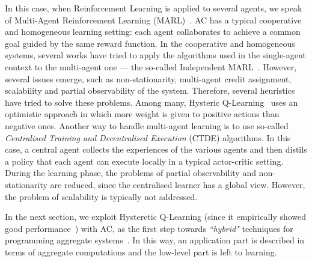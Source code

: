 \documentclass[conference]{IEEEtran}
\begin{document}
In this case, when Reinforcement Learning is applied to several agents, we speak of Multi-Agent Reinforcement Learning (MARL)~\cite{DBLP:journals/aamas/Hernandez-LealK19}.
 AC has a typical cooperative and homogeneous learning setting: 
 each agent collaborates to achieve a common goal guided by the same reward function.
%
In the cooperative and homogeneous systems, several works have tried to apply the algorithms used in the single-agent context to the multi-agent one --- 
 the so-called Independent MARL~\cite{DBLP:journals/tsmc/BusoniuBS08}. 
%
However, several issues emerge, such as non-stationarity, multi-agent credit assignment, scalability and partial observability of the system. 
 Therefore, several heuristics have tried to solve these problems.
%
Among many, Hysteric Q-Learning~\cite{hysteretic-q} uses an optimistic approach in which more weight is given to positive actions than negative ones.
%
Another way to handle multi-agent learning is to use so-called \textit{Centralised Training and Decentralised Execution} (CTDE) algorithms. 
 In this case, a central agent collects the experiences of the various agents and then distils a policy that each agent can execute locally in a typical actor-critic setting. 
%
During the learning phase, the problems of partial observability and non-stationarity are reduced, since the centralised learner has a global view. 
 However, the problem of scalability is typically not addressed.

In the next section, we exploit Hysteretic Q-Learning (since it empirically showed good performance~\cite{DBLP:journals/tsg/HadidiJ13}) with AC, 
 as the first step towards \textit{``hybrid"} techniques for programming aggregate systems~\cite{research}.
 In this way, an application part is described in terms of aggregate computations and the low-level part is left to learning.

\end{document}
